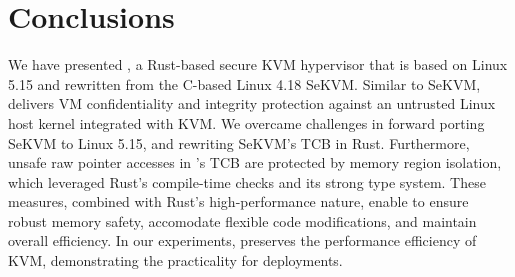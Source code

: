 
\chapter{Conclusions}
\label{sec:conclusions}

We have presented \rustsec{}, a Rust-based secure KVM hypervisor that
is based on Linux 5.15 and rewritten from the C-based Linux 4.18 SeKVM.
Similar to SeKVM, \rustsec{} delivers VM confidentiality and integrity
protection against an untrusted Linux host kernel integrated with KVM.
We overcame challenges in forward porting SeKVM to Linux 5.15, and rewriting
SeKVM's TCB in Rust.
Furthermore, unsafe raw pointer accesses in \rustsec{}'s TCB \rustcore{}
are protected by memory region
isolation, which leveraged Rust's compile-time checks and its strong type
system.
These measures, combined with Rust's high-performance nature, enable \rustsec{}
to ensure robust memory safety, accomodate flexible code modifications, and
maintain overall efficiency.
In our experiments, \rustsec{} preserves the performance efficiency of KVM,
demonstrating the practicality for deployments.

